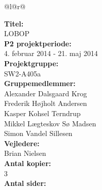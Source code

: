 
\newlength{\realparindent}
\newlength{\realparskip}
\setlength{\realparindent}{\parindent}
\setlength{\realparskip}{\parskip}

\begin{nopagebreak}
{\begin{center}
    \begin{tabular*}{\textwidth}{@{}l@{\extracolsep{\fill}}r@{}}
        \\
        \begin{minipage}[t]{0.49\textwidth}
            \textbf{Titel:}\\
            LOBOP\\
            
            \textbf{P2 projektperiode:}\\
            4. februar 2014 - 21. maj 2014\\
            
            \textbf{Projektgruppe:}\\
            SW2-A405a\\
            
            \textbf{Gruppemedlemmer:}\\
			Alexander Dalsgaard Krog\\
		    Frederik Højholt Andersen\\
		    Kasper Kohsel Terndrup\\
		    Mikkel Lægteskov Sø Madsen\\
		    Simon Vandel Sillesen\\
            
            \textbf{Vejledere:}\\
			Brian Nielsen\\
            
            \textbf{Antal kopier:}\\
            3\\

            \textbf{Antal sider:}\\
           	\numberpages\\ 
            

\end{minipage}
\end{tabular*}
\end{center}}
\end{nopagebreak}

